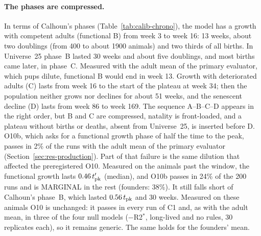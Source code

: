 \paragraph{The phases are compressed.}
In terms of Calhoun's phases (Table~\ref{tab:calib-chrono}), the model has a growth with competent adults
(functional B) from week 3 to week 16: 13 weeks, about two doublings (from 400 to about 1900 animals) and two thirds of
all births. In Universe~25 phase~B lasted 30 weeks and about five doublings, and most births came later, in phase~C.
Measured with the adult mean of the primary evaluator, which pups dilute, functional B would end in week 13. Growth with
deteriorated adults (C) lasts from week 16 to the start of the plateau at week 34; then the population neither
grows nor declines for about 51 weeks, and the senescent decline (D) lasts from week 86 to week 169. The sequence
A--B--C--D appears in the right order, but B and C are compressed, natality is front-loaded, and a plateau without
births or deaths, absent from Universe~25, is inserted before D. O10b, which asks for a functional growth phase of
half the time to the peak, passes in 2\% of the runs with the adult mean of the primary evaluator
(Section~\ref{sec:res-production}). Part of that failure is the same dilution that affected the preregistered O10. Measured
on the animals past the window, the functional growth lasts $0.46\,t'_{\rm pk}$ (median), and O10b passes in 24\% of the
200 runs and is MARGINAL in the rest (founders: 38\%). It still falls short of Calhoun's phase~B, which lasted
$0.56\,t_{\rm pk}$ and 30 weeks. Measured on these animals O10 is unchanged: it passes in every run of \textsf{C1} and, as
with the adult mean, in three of the four null models ($-$R2$^*$, long-lived and no rules, 30 replicates each), so it remains
generic. The same holds for the founders' mean.

